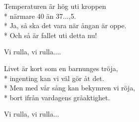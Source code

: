 \begin{SongText}[Temperaturen]
    \begin{SongVerse}
        Temperaturen är hög uti kroppen\\*%
        närmare 40 än 37...,5.\\*%
        Ja, så ska det vara när ångan är oppe.\\*%
        Och så är fallet uti detta nu!
    \end{SongVerse}
    \begin{SongVerse}
        Vi rulla, vi rulla....
    \end{SongVerse}
    \begin{SongVerse}
        Livet är kort som en barnunges tröja,\\*%
        ingenting kan vi väl gör åt det.\\*%
        Men med vår sång kan bekymren vi röja,\\*%
        bort ifrån vardagens gråaktighet.
    \end{SongVerse}
    \begin{SongVerse}
        Vi rulla, vi rulla...
    \end{SongVerse}
\end{SongText}
